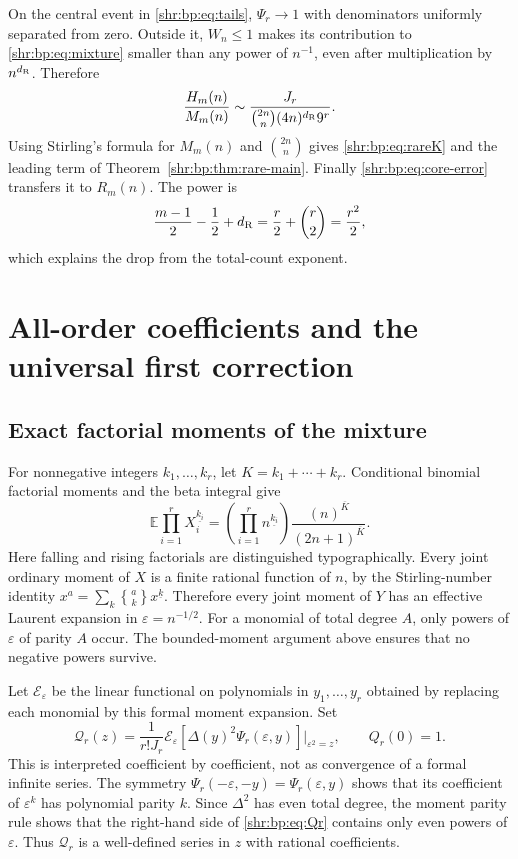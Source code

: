 \documentclass[11pt,letterpaper]{article}
\numberwithin{equation}{section}
\theoremstyle{definition}
\newcommand{\E}{\mathbb E}
\newcommand{\1}{\mathbf 1}
\newcommand{\fall}[2]{#1^{\underline{#2}}}
\newcommand{\eps}{\varepsilon}
\newcommand{\rise}[2]{(#1)^{\overline{#2}}}
\newcommand{\Stirling}[2]{\genfrac{\{}{\}}{0pt}{}{#1}{#2}}
\begin{document}
On the central event in \eqref{shr:bp:eq:tails}, $\Psi_r\to1$ with denominators
uniformly separated from zero. Outside it, $W_n\le1$ makes its contribution
to \eqref{shr:bp:eq:mixture} smaller than any power of $n^{-1}$, even after
multiplication by $n^{d_{\rm R}}$. Therefore
\begin{equation}
 \frac{H_m(n)}{M_m(n)}\sim
 \frac{J_r}{\binom{2n}{n}(4n)^{d_{\rm R}}9^r}.
 \label{shr:bp:eq:core-leading}
\end{equation}
Using Stirling's formula for $M_m(n)$ and $\binom{2n}{n}$ gives
\eqref{shr:bp:eq:rareK} and the leading term of Theorem~\ref{shr:bp:thm:rare-main}.
Finally \eqref{shr:bp:eq:core-error} transfers it to $R_m(n)$.
The power is
\[
 \frac{m-1}{2}-\frac12+d_{\rm R}=\frac r2+\binom r2=\frac{r^2}{2},
\]
which explains the drop from the total-count exponent.

\section{All-order coefficients and the universal first correction}
\label{shr:bp:sec:coefficients}

\subsection{Exact factorial moments of the mixture}
For nonnegative integers $k_1,\ldots,k_r$, let $K=k_1+\cdots+k_r$.
Conditional binomial factorial moments and the beta integral give
\begin{equation}
 \E\prod_{i=1}^r\fall{X_i}{k_i}
 =\left(\prod_{i=1}^r\fall{n}{k_i}\right)
 \frac{\rise{n}{K}}{\rise{2n+1}{K}}.
 \label{shr:bp:eq:factorialmoment}
\end{equation}
Here falling and rising factorials are distinguished typographically.
Every joint ordinary moment of $X$ is a finite rational function of $n$,
by the Stirling-number identity
$x^a=\sum_k \Stirling{a}{k}\fall{x}{k}$. Therefore every joint moment of
$Y$ has an effective Laurent expansion in $\eps=n^{-1/2}$. For a monomial
of total degree $A$, only powers of $\eps$ of parity $A$ occur.
The bounded-moment argument above ensures that no negative powers survive.

Let $\mathcal E_\eps$ be the linear functional on polynomials in
$y_1,\ldots,y_r$ obtained by replacing each monomial by this formal moment
expansion. Set
\begin{equation}
 \mathcal Q_r(z)=\frac1{r!J_r}
 \mathcal E_\eps\!\left[\Delta(y)^2\Psi_r(\eps,y)\right]
 \bigg|_{\eps^2=z},
 \qquad Q_r(0)=1.
 \label{shr:bp:eq:Qr}
\end{equation}
This is interpreted coefficient by coefficient, not as convergence of a
formal infinite series. The symmetry
$\Psi_r(-\eps,-y)=\Psi_r(\eps,y)$ shows that its coefficient of $\eps^k$
has polynomial parity $k$. Since $\Delta^2$ has even total degree, the
moment parity rule shows that the right-hand side of \eqref{shr:bp:eq:Qr}
contains only even powers of $\eps$. Thus $\mathcal Q_r$ is a well-defined series
in $z$ with rational coefficients.
\end{document}
